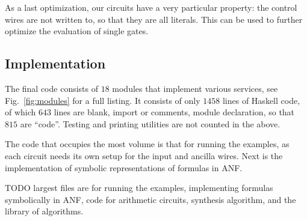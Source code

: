 \documentclass[sigplan]{acmart}
\begin{document}
As a last optimization, our circuits have a very particular property: the control
wires are not written to, so that they are all literals. This can be used to
further optimize the evaluation of single gates.

\subsection{Implementation}

The final code consists of $18$ modules that implement various
services, see Fig.~\ref{fig:modules} for a full listing. It consists of
only $1458$ lines of Haskell code, of which $643$ lines are blank, import or
comments, module declaration, so that $815$ are ``code''. Testing and printing
utilities are not counted in the above.

The code that occupies the most volume is that for running the examples, as each
circuit needs its own setup for the input and ancilla wires. Next is the implementation
of symbolic representations of formulas in ANF.

TODO  largest files are for running the examples, implementing formulas
    symbolically in ANF, code for arithmetic circuits, synthesis algorithm,
    and the library of algorithms.
\end{document}
